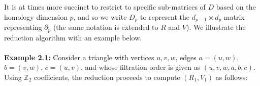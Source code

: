 \documentclass[sn-mathphys]{sn-jnl}
\begin{document}
 It is at times more succinct to restrict to specific sub-matrices of $D$ based on the homology dimension $p$, and so we write $D_p$ to represent the $d_{p-1} \times d_p$ matrix representing $\partial_p$ (the same notation is extended to $R$ and $V$).
We illustrate the reduction algorithm with an example   below. 
\\
\\
\noindent
\textbf{Example 2.1:} Consider a triangle with vertices $u,v,w$, edges $a = (u,w)$, $b = (v,w)$, $c = (u, v)$,
and whose filtration order is given as $ (u, v, w, a, b, c)$. 
Using $\mathbb{Z}_2$ coefficients, the reduction proceeds to compute $(R_1,V_1)$ as follows:
\end{document}
